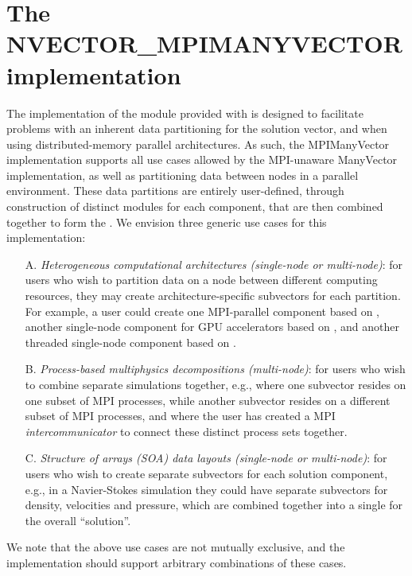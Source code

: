 %
\section{The NVECTOR\_MPIMANYVECTOR implementation}\label{ss:nvec_mpimanyvector}

The {\nvecmpimanyvector} implementation of the {\nvector} module provided
with {\sundials} is designed to facilitate problems with an inherent
data partitioning for the solution vector, and when using
distributed-memory parallel architectures.  As such, the MPIManyVector
implementation supports all use cases allowed by the MPI-unaware
ManyVector implementation, as well as partitioning data between nodes
in a parallel environment.  These data partitions are entirely
user-defined, through construction of distinct {\nvector} modules for
each component, that are then combined together to form the
{\nvecmpimanyvector}.  We envision three generic use cases for this
implementation:
\begin{itemize}
\item[A.] \emph{Heterogeneous computational architectures (single-node or
  multi-node)}: for users who wish to partition data on a node between
  different computing resources, they may create architecture-specific
  subvectors for each partition.  For example, a user could create one
  MPI-parallel component based on {\nvecp}, another single-node
  component for GPU accelerators based on {\nveccuda}, and another
  threaded single-node component based on {\nvecopenmp}.
\item[B.] \emph{Process-based multiphysics decompositions (multi-node)}: for
  users who wish to combine separate simulations together, e.g., where
  one subvector resides on one subset of MPI processes, while another
  subvector resides on a different subset of MPI processes, and where
  the user has created a MPI \emph{intercommunicator} to connect these
  distinct process sets together.
\item[C.] \emph{Structure of arrays (SOA) data layouts (single-node or
  multi-node)}: for users who wish to create separate subvectors for
  each solution component, e.g., in a Navier-Stokes simulation they
  could have separate subvectors for density, velocities and
  pressure, which are combined together into a single
  {\nvecmpimanyvector} for the overall ``solution''.
\end{itemize}
We note that the above use cases are not mutually exclusive, and the
{\nvecmpimanyvector} implementation should support arbitrary combinations
of these cases.

